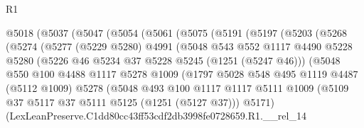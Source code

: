 \begin{lexlean}{R1}
\begin{coremodule}
                @5018
                  (@5037
                    (@5047
                      (@5054
                        (@5061
                          (@5075
                            (@5191
                              (@5197
                                (@5203
                                  (@5268
                                    (@5274
                                      (@5277
                                        (@5229 @5280)
                                        @4991
                                        (@5048
                                          @543
                                          @552
                                          @1117
                                          @4490
                                          @5228
                                          @5280
                                          (@5226 @46 @5234 @37 @5228 @5245 (@1251 (@5247 @46)))
                                          (@5048
                                            @550
                                            @100
                                            @4488
                                            @1117
                                            @5278
                                            @1009
                                            (@1797
                                              @5028
                                              @548
                                              @495
                                              @1119
                                              @4487
                                              (@5112 @1009)
                                              @5278
                                              (@5048
                                                @493
                                                @100
                                                @1117
                                                @1117
                                                @5111
                                                @1009
                                                (@5109
                                                  @37
                                                  @5117
                                                  @37
                                                  @5111
                                                  @5125
                                                  (@1251 (@5127 @37)))
                                                @5171)
                                              (LexLeanPreserve.C1dd80cc43ff53cdf2db3998fe0728659.R1.__rel_14

\end{coremodule}
\end{lexlean}
